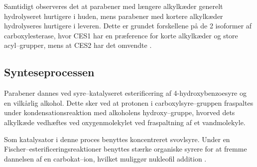     Samtidigt observeres det at parabener med længere alkylkæder generelt hydrolyseret hurtigere i huden, mens parabener med kortere alkylkæder hydrolyseres hurtigere i leveren. Dette er grundet forskellene på de 2 isoformer af carboxylesterase, hvor CES1 har en præference for korte alkylkæder og store acyl--grupper, mens at CES2 har det omvendte \parencite{Cath2021}.

    \subsection{Synteseprocessen}
    Parabener dannes ved syre--katalyseret esterificering af 4-hydroxybenzoesyre og en vilkårlig alkohol. Dette sker ved at protonen i carboxylsyre--gruppen fraspaltes under kondensationsreaktion med alkoholens hydroxy--gruppe, hvorved dets alkylkæde vedhæftes ved oxygenmolekylet ved fraspaltning af et vandmolekyle.

    Som katalysator i denne proces benyttes koncentreret svovlsyre. Under en Fischer--esterificeringsreaktioner benyttes stærke organiske syrere for at fremme dannelsen af en carbokat--ion, hvilket muliggør nukleofil addition \parencite{Stev2023}. 

